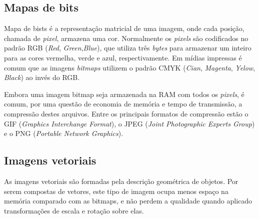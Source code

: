 \subsection{Mapas de bits}

Mapa de bists é a representação matricial de uma imagem, onde cada posição,
chamada de \textit{pixel}, armazena uma cor. Normalmente os \textit{pixels} são
codificados no padrão RGB (\textit{Red}, \textit{Green},\textit{Blue}), que
utiliza três \textit{bytes} para armazenar um inteiro para as cores vermelha,
verde e azul, respectivamente. Em mídias impressas é comum que as imagens
\textit{bitmaps} utilizem o padrão
CMYK (\textit{Cian}, \textit{Magenta}, \textit{Yelow}, \textit{Black}) ao invés
do RGB.

Embora uma imagem bitmap seja armazenada na RAM com todos os \textit{pixels}, é
comum, por uma questão de economia de memória e tempo de transmissão, a compressão
destes arquivos. Entre os principais formatos de compressão estão
o GIF (\textit{Graphics Interchange Format}), o JPEG
(\textit{Joint Photographic Experts Group}) e o PNG (\textit{Portable Network Graphics}).

\subsection{Imagens vetoriais}

As imagens vetoriais são formadas pela descrição geométrica de objetos.
Por serem compostas de vetores, este tipo de imagem ocupa menos espaço na
memória comparado com as bitmaps, e não perdem a qualidade quando
aplicado transformações de escala e rotação sobre elas.

